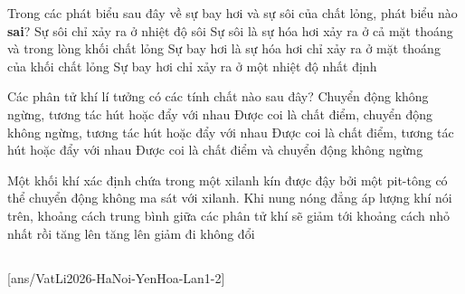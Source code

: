 	\begin{ex}%
		Trong các phát biểu sau đây về sự bay hơi và sự sôi của chất lỏng, phát biểu nào \textbf{sai}?
		\choice
		{Sự sôi chỉ xảy ra ở nhiệt độ sôi}
		{Sự sôi là sự hóa hơi xảy ra ở cả mặt thoáng và trong lòng khối chất lỏng}
		{Sự bay hơi là sự hóa hơi chỉ xảy ra ở mặt thoáng của khối chất lỏng}
		{\True Sự bay hơi chỉ xảy ra ở một nhiệt độ nhất định}
	\end{ex}

	\begin{ex}%
		Các phân tử khí lí tưởng có các tính chất nào sau đây?
		\choice
		{Chuyển động không ngừng, tương tác hút hoặc đẩy với nhau}
		{Được coi là chất điểm, chuyển động không ngừng, tương tác hút hoặc đẩy với nhau}
		{Được coi là chất điểm, tương tác hút hoặc đẩy với nhau}
		{\True Được coi là chất điểm và chuyển động không ngừng}
	\end{ex}

	\begin{ex}%
		Một khối khí xác định chứa trong một xilanh kín được đậy bởi một pit-tông có thể chuyển động không ma sát với xilanh. Khi nung nóng đẳng áp lượng khí nói trên, khoảng cách trung bình giữa các phân tử khí sẽ
		\choice
		{giảm tới khoảng cách nhỏ nhất rồi tăng lên}
		{\True tăng lên}
		{giảm đi}
		{không đổi}
	\end{ex}

	\subsection*{}
	\setcounter{ex}{0}
	[ans/VatLi2026-HaNoi-YenHoa-Lan1-2]

